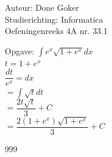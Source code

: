 \documentclass[a4paper]{article}
\begin{document}
  
\noindent \large Auteur: Done Goker \\
\noindent \large Studierichting: Informatica\\
\noindent \large Oefeningenreeks 4A nr. 33.1\\

\medskip

\normalsize

Opgave:
$\displaystyle\int e^x\sqrt{1+e^x}dx$ \\

$t = 1+ e^x$ \\

$ \dfrac{dt}{e^x}  = dx$ \\

$= \displaystyle\int \sqrt{t} dt$ \\

$= \dfrac{2 t\sqrt{t}}{3} + C$ \\

$= \dfrac{2 (1+e^x)\sqrt{1+e^x}}{3} + C$


\begin{thebibliography}{999}
\end{thebibliography}
\end{document}
